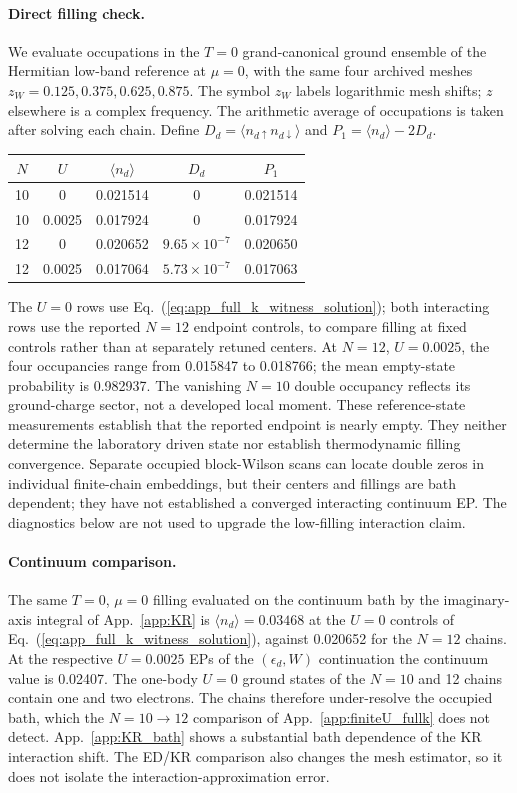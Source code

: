 \documentclass[%
  aps,physrev,onecolumn,10pt,amsmath,amssymb,superscriptaddress,longbibliography,floatfix
]{revtex4-2}
\begin{document}
\paragraph{Direct filling check.}
We evaluate occupations in the $T=0$ grand-canonical ground ensemble of the
Hermitian low-band reference at $\mu=0$, with the same four archived meshes
$z_W=0.125,0.375,0.625,0.875$.  The symbol $z_W$ labels logarithmic mesh
shifts; $z$ elsewhere is a complex frequency.  The arithmetic average of
occupations is taken after solving each chain.  Define
$D_d=\langle n_{d\uparrow}n_{d\downarrow}\rangle$ and $P_1=\langle n_d\rangle-2D_d$.
\begin{center}
\begin{tabular}{@{}ccccc@{}}
\toprule
$N$ & $U$ & $\langle n_d\rangle$ & $D_d$ & $P_1$\\
\midrule
10 & 0 & 0.021514 & 0 & 0.021514\\
10 & 0.0025 & 0.017924 & 0 & 0.017924\\
12 & 0 & 0.020652 & $9.65\times10^{-7}$ & 0.020650\\
12 & 0.0025 & 0.017064 & $5.73\times10^{-7}$ & 0.017063\\
\bottomrule
\end{tabular}
\end{center}
The $U=0$ rows use Eq.~(\ref{eq:app_full_k_witness_solution}); both
interacting rows use the reported $N=12$ endpoint controls, to compare
filling at fixed controls rather than at separately retuned centers.
At $N=12$, $U=0.0025$, the four occupancies range from 0.015847 to 0.018766;
the mean empty-state probability is 0.982937.  The vanishing $N=10$
double occupancy reflects its ground-charge sector, not a developed local
moment.  These reference-state measurements establish that the reported
endpoint is nearly empty.  They neither determine the laboratory driven
state nor establish thermodynamic filling convergence.  Separate occupied block-Wilson scans can locate double zeros in individual
finite-chain embeddings, but their centers and fillings are bath dependent;
they have not established a converged interacting continuum EP. The
diagnostics below are not used to upgrade the low-filling interaction claim.

\paragraph{Continuum comparison.}
The same $T=0$, $\mu=0$ filling evaluated on the continuum bath by the
imaginary-axis integral of App.~\ref{app:KR} is $\langle n_d\rangle=0.03468$
at the $U=0$ controls of Eq.~(\ref{eq:app_full_k_witness_solution}), against
0.020652 for the $N=12$ chains.  At the respective $U=0.0025$ EPs of the
$(\epsilon_d,W)$ continuation the continuum value is 0.02407.  The one-body
$U=0$ ground states of the $N=10$ and 12 chains contain one and two electrons.
The chains therefore under-resolve the occupied bath, which the $N=10\to12$
comparison of App.~\ref{app:finiteU_fullk} does not detect.
App.~\ref{app:KR_bath} shows a substantial bath dependence of the KR
interaction shift.  The ED/KR comparison also changes the mesh estimator,
so it does not isolate the interaction-approximation error.
\end{document}
